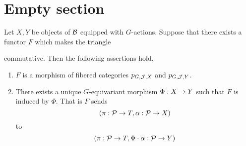 \section{Empty section}

\begin{proposition}\label{proposition:equivariant_morphisms_can_described_by_fibered_categories}
Let $X,Y$ be objects of ${\mathcal B}$ equipped with $G$-actions. Suppose that there exists a functor $F$ which makes the triangle
\begin{center}
\end{center}
commutative. Then the following assertions hold.
\begin{enumerate}[label=\emph{\textbf{(\arabic*)}}, leftmargin=3.0em]
\item $F$ is a morphism of fibered categories $p_{G,{\mathcal J},X}$ and $p_{G,{\mathcal J},Y}$.
\item There exists a unique $G$-equivariant morphism $\Phi:X\rightarrow Y$ such that $F$ is induced by $\Phi$. That is $F$ sends
$$(\pi:{\mathcal P}\rightarrow T,\alpha:{\mathcal P}\rightarrow X)$$
to
$$(\pi:{\mathcal P}\rightarrow T,\Phi\cdot \alpha:{\mathcal P}\rightarrow Y)$$
\end{enumerate}
\end{proposition}


































